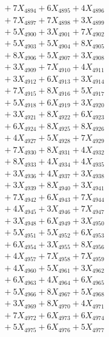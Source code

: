\documentclass[a4paper,10pt]{article}
\begin{document}
{\begin{align}
&\;  + 7 X_{4894} + 6 X_{4895} + 4 X_{4896} \\[0.3ex]
&\;  + 7 X_{4897} + 7 X_{4898} + 3 X_{4899} \\[0.5ex]\allowbreak
&\;  + 5 X_{4900} + 3 X_{4901} + 7 X_{4902} \\[0.3ex]
&\;  + 5 X_{4903} + 5 X_{4904} + 8 X_{4905} \\[0.3ex]
&\;  + 8 X_{4906} + 5 X_{4907} + 3 X_{4908} \\[0.3ex]
&\;  + 3 X_{4909} + 7 X_{4910} + 4 X_{4911} \\[0.3ex]
&\;  + 3 X_{4912} + 6 X_{4913} + 3 X_{4914} \\[0.3ex]
&\;  + 7 X_{4915} + 8 X_{4916} + 5 X_{4917} \\[0.3ex]
&\;  + 5 X_{4918} + 6 X_{4919} + 3 X_{4920} \\[0.3ex]
&\;  + 3 X_{4921} + 8 X_{4922} + 6 X_{4923} \\[0.3ex]
&\;  + 6 X_{4924} + 8 X_{4925} + 8 X_{4926} \\[0.3ex]
&\;  + 4 X_{4927} + 5 X_{4928} + 7 X_{4929} \\[0.5ex]\allowbreak
&\;  + 7 X_{4930} + 8 X_{4931} + 4 X_{4932} \\[0.3ex]
&\;  + 8 X_{4933} + 4 X_{4934} + 4 X_{4935} \\[0.3ex]
&\;  + 3 X_{4936} + 4 X_{4937} + 3 X_{4938} \\[0.3ex]
&\;  + 3 X_{4939} + 8 X_{4940} + 3 X_{4941} \\[0.3ex]
&\;  + 7 X_{4942} + 6 X_{4943} + 7 X_{4944} \\[0.3ex]
&\;  + 4 X_{4945} + 3 X_{4946} + 7 X_{4947} \\[0.3ex]
&\;  + 3 X_{4948} + 6 X_{4949} + 3 X_{4950} \\[0.3ex]
&\;  + 5 X_{4951} + 5 X_{4952} + 6 X_{4953} \\[0.3ex]
&\;  + 6 X_{4954} + 3 X_{4955} + 8 X_{4956} \\[0.3ex]
&\;  + 4 X_{4957} + 7 X_{4958} + 7 X_{4959} \\[0.5ex]\allowbreak
&\;  + 4 X_{4960} + 5 X_{4961} + 3 X_{4962} \\[0.3ex]
&\;  + 6 X_{4963} + 4 X_{4964} + 6 X_{4965} \\[0.3ex]
&\;  + 5 X_{4966} + 8 X_{4967} + 5 X_{4968} \\[0.3ex]
&\;  + 3 X_{4969} + 8 X_{4970} + 4 X_{4971} \\[0.3ex]
&\;  + 7 X_{4972} + 6 X_{4973} + 6 X_{4974} \\[0.3ex]
&\;  + 5 X_{4975} + 6 X_{4976} + 5 X_{4977} \\[0.3ex]

\end{align}}
\end{document}
